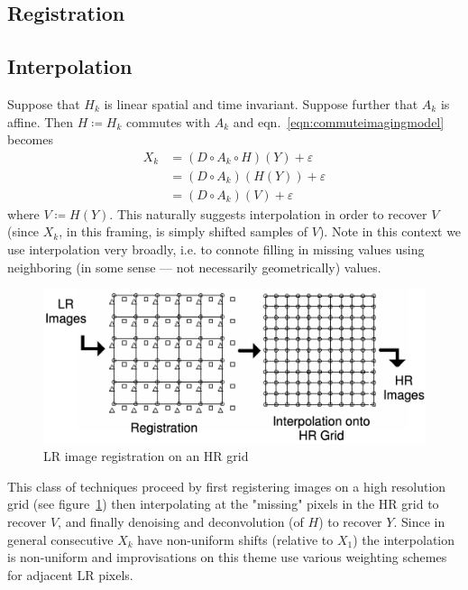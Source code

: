\newcommand*{\bx}{\bm{x}}
\newcommand*{\bX}{\bm{X}}
\newcommand*{\bxi}{\bm{x}_i}
\newcommand*{\delx}{\bx - \bxi}
\newcommand*{\by}{\bm{y}}
\newcommand*{\bY}{\bm{Y}}
\newcommand*{\byi}{\bm{y}_i}
\newcommand*{\dely}{\by - \byi}
\newcommand*{\zbx}{Z(\bx)}
\newcommand*{\zbxi}{Z(\bxi)}
\newcommand*{\bb}{\bm{\beta}}
\newcommand*{\hzbx}{\hat{Z}(\bx)}
\newcommand*{\etal}{\textit{et al. }}

%
\subsection{Registration}\label{subsec:registration}
\subsection{Interpolation}\label{subsec:interpolation}
Suppose that $H_k$ is linear spatial and time invariant.
%
Suppose further that $A_k$ is affine.
%
Then $H \coloneqq H_k$ commutes with $A_k$\cite{meladcommute} and eqn.~\ref{eqn:commuteimagingmodel} becomes
\begin{equation}
    \label{eqn:commuteimagingmodel}
    \begin{split}
        X_k &= (D \circ A_k \circ H) (Y) + \varepsilon \\
        &= (D \circ A_k) (H(Y)) + \varepsilon \\
        &= (D \circ A_k) (V) + \varepsilon
    \end{split}
\end{equation}
%
where $V \coloneqq H(Y)$.
%
This naturally suggests interpolation in order to recover $V$ (since $X_k$, in this framing, is simply shifted samples of $V$).
%
Note in this context we use interpolation very broadly, i.e. to connote filling in missing values using neighboring (in some sense --- not necessarily geometrically) values.
%
\begin{figure}
    \centering
    \includegraphics[width=\linewidth,keepaspectratio]{figures/hrgrid.png}
    \caption{LR image registration on an HR grid\cite{Lin}}
    \label{fig:hrgrid}
\end{figure}
This class of techniques proceed by first registering images on a high resolution grid (see figure~\ref{fig:hrgrid}) then interpolating at the "missing" pixels in the HR grid to recover $V$, and finally denoising and deconvolution (of $H$) to recover $Y$.
%
Since in general consecutive $X_k$ have non-uniform shifts (relative to $X_1$) the interpolation is non-uniform and improvisations on this theme use various weighting schemes for adjacent LR pixels.


